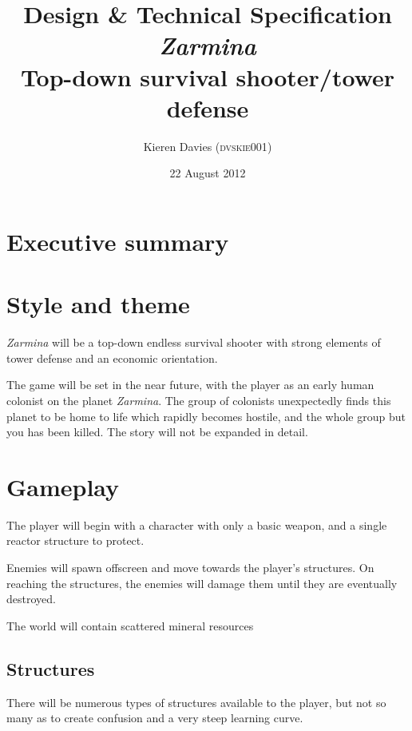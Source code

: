 \documentclass[a4paper,titlepage]{article}
\begin{document}
\title{Design \& Technical Specification \\ \vspace{0.5em}
       \emph{Zarmina} \\ \vspace{1em}
       \large{Top-down survival shooter/tower defense}}
\author{Kieren Davies (\textsc{dvskie001})}
\date {22 August 2012}
\maketitle

\section{Executive summary}

\section{Style and theme}

\emph{Zarmina} will be a top-down endless survival shooter with strong elements of tower defense and an economic orientation.

The game will be set in the near future, with the player as an early human colonist on the
planet \emph{Zarmina}.  The group of colonists unexpectedly finds this planet to be home to life which rapidly becomes hostile, and the whole group but you has been killed.  The story will not be expanded in detail.

\section{Gameplay}

The player will begin with a character with only a basic weapon, and a single reactor structure to protect.

Enemies will spawn offscreen and move towards the player's structures.  On reaching the structures, the enemies will damage them until they are eventually destroyed.

The world will contain scattered mineral resources

\subsection{Structures}

There will be numerous types of structures available to the player, but not so many as to create confusion and a very steep learning curve.
\end{document}
